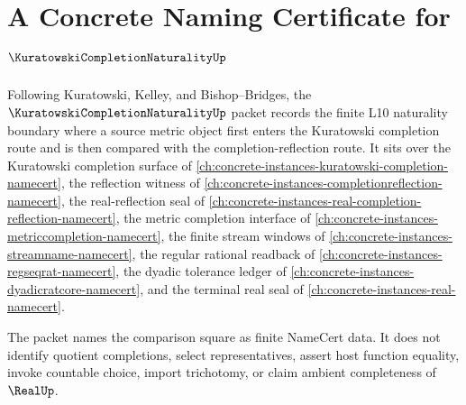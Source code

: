 \chapter{A Concrete Naming Certificate for $\KuratowskiCompletionNaturalityUp$}
\label{ch:concrete-instances-kuratowski-completion-naturality-namecert}

Following Kuratowski, Kelley, and Bishop--Bridges, the $\KuratowskiCompletionNaturalityUp$ packet records the finite L10 naturality boundary where a source metric object first enters the Kuratowski completion route and is then compared with the completion-reflection route. It sits over the Kuratowski completion surface of \autoref{ch:concrete-instances-kuratowski-completion-namecert}, the reflection witness of \autoref{ch:concrete-instances-completionreflection-namecert}, the real-reflection seal of \autoref{ch:concrete-instances-real-completion-reflection-namecert}, the metric completion interface of \autoref{ch:concrete-instances-metriccompletion-namecert}, the finite stream windows of \autoref{ch:concrete-instances-streamname-namecert}, the regular rational readback of \autoref{ch:concrete-instances-regseqrat-namecert}, the dyadic tolerance ledger of \autoref{ch:concrete-instances-dyadicratcore-namecert}, and the terminal real seal of \autoref{ch:concrete-instances-real-namecert}.

The packet names the comparison square as finite NameCert data. It does not identify quotient completions, select representatives, assert host function equality, invoke countable choice, import trichotomy, or claim ambient completeness of $\RealUp$.

